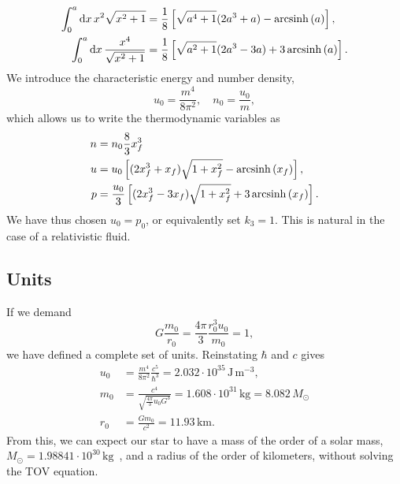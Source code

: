 %
\begin{align}
    \int_0^a \text{d} x \, x^2 \sqrt{x^2 + 1} 
    & = \frac{1}{8} 
    \left[\sqrt{a^4 + 1}(2 a^3 + a) - \operatorname{arcsinh}\left(a\right)\right], \\
    \int_0^a \text{d} x \, \frac{x^4}{\sqrt{x^2 + 1} }
    & = \frac{1}{8} 
    \left[\sqrt{a^2 + 1}(2 a^3 - 3a) + 3\operatorname{arcsinh}\left(a\right)\right].
\end{align}
%
We introduce the characteristic energy and number density,
% 
\begin{equation}
    u_0 = \frac{m^4}{8 \pi^2}, \quad n_0 = \frac{u_0}{m},
\end{equation}
%
which allows us to write the thermodynamic variables as
%
\begin{align}
    n &= n_0 \frac{8}{3} x_f^3 \\
    \label{Fermi gas energy density}
    u &= u_0
    \left[(2x_f^3 + x_f) \sqrt{1 + x_f^2} - \operatorname{arcsinh}\left(x_f\right)\right], \\
    \label{Fermi gas pressure}
    p &= \frac{u_0}{3}
    \left[(2x_f^3 - 3x_f) \sqrt{1 + x_f^2} + 3\operatorname{arcsinh}\left(x_f\right)\right].
\end{align}
%
We have thus chosen $u_0 = p_0$, or equivalently set $k_3 = 1$.
This is natural in the case of a relativistic fluid.

\subsection*{Units}

If we demand
%
\begin{equation}
    G \frac{m_0}{r_0} = \frac{4 \pi }{3}\frac{r_0^3 u_0}{m_0} = 1,
\end{equation}
%
we have defined a complete set of units.
Reinstating $\hbar$ and $c$ gives
%
\begin{align}
    u_0 &= \frac{m^4}{8 \pi^2}\frac{c^5}{\hbar^3} 
    = 2.032\cdot10^{35}  \, \text{J}\,\text{m}^{-3}, \\
    m_0 &= \frac{c^4}{\sqrt{\frac{4 \pi}{3} u_0 G^3} }
    = 1.608 \cdot 10^{31} \, \text{kg}
    = 8.082 \, M_\odot \\
    r_0 &= \frac{G m_0}{c^2} = 11.93 \, \text{km}. %
\end{align}
%
From this, we can expect our star to have a mass of the order of a solar mass, $M_\odot = 1.988 41\cdot 10^{30}\, \text{kg}$~\autocite{particledatagroupReviewParticlePhysics2020}, and a radius of the order of kilometers, without solving the TOV equation.


